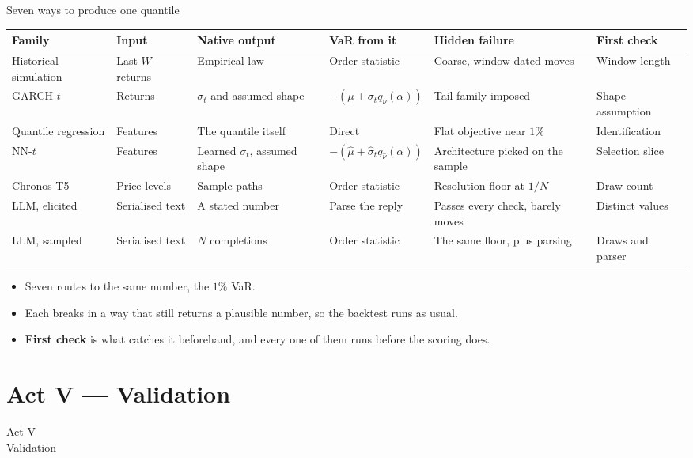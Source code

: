\documentclass[9pt, aspectratio=169, t]{beamer}
\newcommand{\points}[1]{%
  \par\vspace{0.25em}%
  \begin{block}{}
    \vspace{-0.45em}
    {\small
     \setlength{\itemsep}{1pt}
     \begin{itemize}#1\end{itemize}}
    \vspace{-0.35em}
  \end{block}}
\begin{document}
\begin{frame}{Seven ways to produce one quantile}
  \centering\scriptsize
  \renewcommand{\arraystretch}{1.15}
  \begin{tabular}{@{}L{2.15cm}L{1.6cm}L{1.9cm}L{1.8cm}L{2.75cm}L{1.9cm}@{}}
    \toprule
    \textbf{Family} & \textbf{Input} & \textbf{Native output} & \textbf{VaR from it} &
    \textbf{Hidden failure} & \textbf{First check} \\
    \midrule
    Historical simulation & Last $W$ returns & Empirical law & Order statistic &
      Coarse, window-dated moves & Window length \\
    GARCH-$t$ & Returns & $\sigma_t$ and assumed shape & $-(\mu + \sigma_t q_\nu(\alpha))$ &
      Tail family imposed & Shape assumption \\
    Quantile regression & Features & The quantile itself & Direct &
      Flat objective near $1\%$ & Identification \\
    NN-$t$ & Features & Learned $\sigma_t$, assumed shape &
      $-(\hat\mu + \hat\sigma_t q_{\hat\nu}(\alpha))$ &
      Architecture picked on the sample & Selection slice \\
    Chronos-T5 & Price levels & Sample paths & Order statistic &
      Resolution floor at $1/N$ & Draw count \\
    LLM, elicited  & Serialised text & A stated number & Parse the reply &
      Passes every check, barely moves & Distinct values \\
    LLM, sampled  & Serialised text & $N$ completions & Order statistic &
      The same floor, plus parsing & Draws and parser \\
    \bottomrule
  \end{tabular}
  \points{%
      \item Seven routes to the same number, the $1\%$ VaR.
      \item Each breaks in a way that still returns a plausible number, so the backtest runs as usual.
      \item \textbf{First check} is what catches it beforehand, and every one of them runs before the scoring does.
  }
\end{frame}

\section{Act V --- Validation}
\begin{frame}[plain]
  \centering\vfill
  {\Large\textcolor{IDAred}{Act V}}\\[0.4em]
  {\large Validation}
  \vfill
\end{frame}
\end{document}
